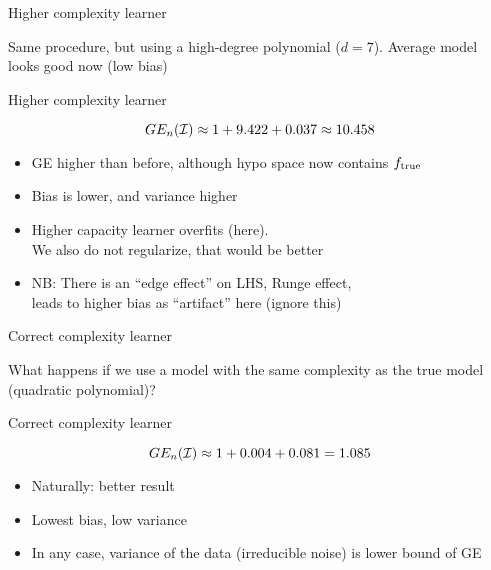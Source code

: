\documentclass[11pt,compress,t,notes=noshow, xcolor=table]{beamer}
\begin{document}
\begin{framei}[sep=M]{Higher complexity learner}

\item Same procedure, but using a high-degree polynomial ($d=7$). Average model looks good now (low bias)

\hfill


\end{framei} 

\begin{frame}{Higher complexity learner}

\splitVThree
{}
{}
{}


$$GE_n(\mathcal{I}) \approx 1 + 9.422 + 0.037 \approx 10.458 $$

\vfill

\begin{itemize}
\item GE higher than before, although hypo space now contains $f_{\text{true}}$
\item Bias is lower, and variance higher 
\item Higher capacity learner overfits (here).\\
We also do not regularize, that would be better

\item NB: There is an ``edge effect'' on LHS, Runge effect,\\
leads to higher bias as ``artifact'' here (ignore this)
\end{itemize}

\end{frame}

\begin{framei}[sep=M]{Correct complexity learner}

\item What happens if we use a model with the same complexity as the true model (quadratic polynomial)? 

\hfill


\end{framei}

\begin{frame}{Correct complexity learner}

\splitVThree
{}
{}
{}

\vfill

$$GE_n(\mathcal{I}) \approx 1 + 0.004 + 0.081 = 1.085 $$

\begin{itemize}
\item Naturally: better result
\item Lowest bias, low variance
\item In any case, variance of the data (irreducible noise) is lower bound of GE
\end{itemize}

\end{frame}
\end{document}
